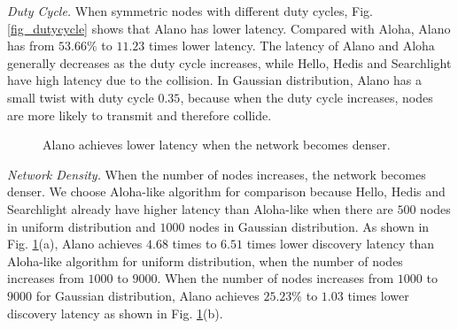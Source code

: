 \emph{Duty Cycle.}
When symmetric nodes with different duty cycles, Fig. \ref{fig_dutycycle} shows that Alano has lower latency. Compared with Aloha, Alano has from $53.66\%$ to $11.23$ times lower latency. The latency of Alano and Aloha generally decreases as the duty cycle increases, while Hello, Hedis and Searchlight have high latency due to the collision. In Gaussian distribution, Alano has a small twist with duty cycle $0.35$, because when the duty cycle increases, nodes are more likely to transmit and therefore collide.


\begin{figure}[!h]
\centering
{}
\hspace{0.01in}
\caption{Alano achieves lower latency when the network becomes denser.}
\label{fig_node}
\end{figure}

\emph{Network Density.}
When the number of nodes increases, the network becomes denser. We choose Aloha-like algorithm for comparison because Hello, Hedis and Searchlight already have higher latency than Aloha-like when there are $500$ nodes in uniform distribution and $1000$ nodes in Gaussian distribution.
As shown in Fig. \ref{fig_node}(a), Alano achieves $4.68$ times to $6.51$ times lower discovery latency than Aloha-like algorithm for uniform distribution, when the number of nodes increases from $1000$ to $9000$.
When the number of nodes increases from $1000$ to $9000$ for Gaussian distribution, Alano achieves $25.23\%$ to $1.03$ times lower discovery latency as shown in Fig. \ref{fig_node}(b).  




